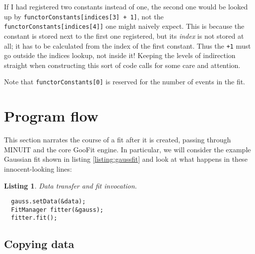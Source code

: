 \documentclass[12pt,pdflatex]{article}
\newtheorem{listing}{Listing}
\begin{document}
If I had registered two constants instead of one, the second one would be looked
up by \verb|functorConstants[indices[3] + 1]|, not the \texttt{functorConstants[indices[4]]}
one might naively expect. This is because the constant is stored next to the first one
registered, but its \emph{index} is not stored at all; it has to be calculated from the
index of the first constant. Thus the \verb|+1| must go outside the indices lookup,
not inside it! Keeping the levels of indirection
straight when constructing this sort of code calls for some care and attention. 

Note that \verb|functorConstants[0]| is reserved for the number of events
in the fit. 

\section{Program flow} 
\label{sec:engine}

This section narrates the course of a fit after it is created, passing through
MINUIT and the core GooFit engine. In particular, we will consider the example
Gaussian fit shown in listing \ref{listing:gaussfit} and look at what happens
in these innocent-looking lines:
\begin{listing}
\label{listing:actualfit}
Data transfer and fit invocation.

\begin{verbatim}
  gauss.setData(&data);
  FitManager fitter(&gauss); 
  fitter.fit(); 
\end{verbatim}
\end{listing} 

\subsection{Copying data} 
\end{document}

